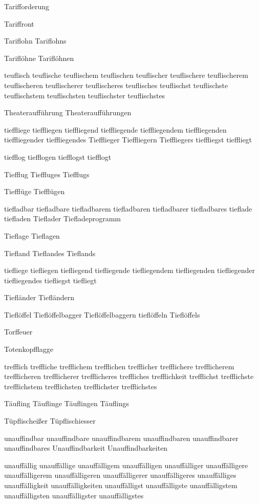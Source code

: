 Tarifforderung

Tariffront

Tariflohn Tariflohns

Tariflöhne Tariflöhnen

teuflisch teuflische teuflischem teuflischen teuflischer teuflischere teuflischerem teuflischeren teuflischerer teuflischeres teuflisches teuflischst teuflischste teuflischstem teuflischsten teuflischster teuflischstes

Theateraufführung Theateraufführungen

tieffliege tieffliegen tieffliegend tieffliegende tieffliegendem tieffliegenden tieffliegender tieffliegendes Tiefflieger Tieffliegern Tieffliegers tieffliegst tieffliegt

tiefflog tiefflogen tiefflogst tiefflogt

Tiefflug Tieffluges Tiefflugs

Tiefflüge Tiefflügen

tiefladbar tiefladbare tiefladbarem tiefladbaren tiefladbarer tiefladbares tieflade tiefladen Tieflader Tiefladeprogramm

Tieflage Tieflagen

Tiefland Tieflandes Tieflands

tiefliege tiefliegen tiefliegend tiefliegende tiefliegendem tiefliegenden tiefliegender tiefliegendes tiefliegst tiefliegt

Tiefländer Tiefländern

Tieflöffel Tieflöffelbagger Tieflöffelbaggern tieflöffeln Tieflöffels

Torffeuer

Totenkopfflagge

trefflich treffliche trefflichem trefflichen trefflicher trefflichere trefflicherem trefflicheren trefflicherer trefflicheres treffliches trefflichkeit trefflichst trefflichste trefflichstem trefflichsten trefflichster trefflichstes

Täufling Täuflinge Täuflingen Täuflings

Tüpflischeißer Tüpflischiesser

unauffindbar unauffindbare unauffindbarem unauffindbaren unauffindbarer unauffindbares Unauffindbarkeit Unauffindbarkeiten

unauffällig unauffällige unauffälligem unauffälligen unauffälliger unauffälligere unauffälligerem unauffälligeren unauffälligerer unauffälligeres unauffälliges unauffälligkeit unauffälligkeiten unauffälligst unauffälligste unauffälligstem unauffälligsten unauffälligster unauffälligstes

